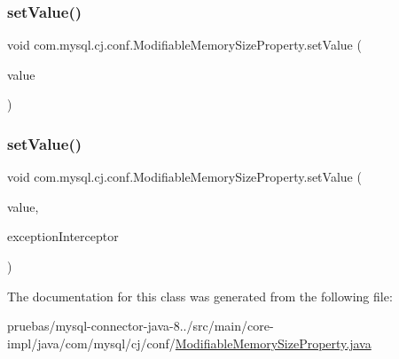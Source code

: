 \mbox{\label{classcom_1_1mysql_1_1cj_1_1conf_1_1_modifiable_memory_size_property_ad59087614f7875248e28ca184945853b}} 
\subsubsection{\texorpdfstring{set\+Value()}{setValue()}\hspace{0.1cm}{\footnotesize\ttfamily [1/2]}}
{\footnotesize\ttfamily void com.\+mysql.\+cj.\+conf.\+Modifiable\+Memory\+Size\+Property.\+set\+Value (\begin{DoxyParamCaption}\item[{Integer}]{value }\end{DoxyParamCaption})}

\mbox{\label{classcom_1_1mysql_1_1cj_1_1conf_1_1_modifiable_memory_size_property_aa7aaac2a1212ab395eb104b928c71012}} 
\subsubsection{\texorpdfstring{set\+Value()}{setValue()}\hspace{0.1cm}{\footnotesize\ttfamily [2/2]}}
{\footnotesize\ttfamily void com.\+mysql.\+cj.\+conf.\+Modifiable\+Memory\+Size\+Property.\+set\+Value (\begin{DoxyParamCaption}\item[{Integer}]{value,  }\item[{\mbox{\hyperlink{interfacecom_1_1mysql_1_1cj_1_1exceptions_1_1_exception_interceptor}{Exception\+Interceptor}}}]{exception\+Interceptor }\end{DoxyParamCaption})}



The documentation for this class was generated from the following file\+:\begin{DoxyCompactItemize}
\item 
pruebas/mysql-\/connector-\/java-\/8../src/main/core-\/impl/java/com/mysql/cj/conf/\mbox{\hyperlink{_modifiable_memory_size_property_8java}{Modifiable\+Memory\+Size\+Property.\+java}}\end{DoxyCompactItemize}
